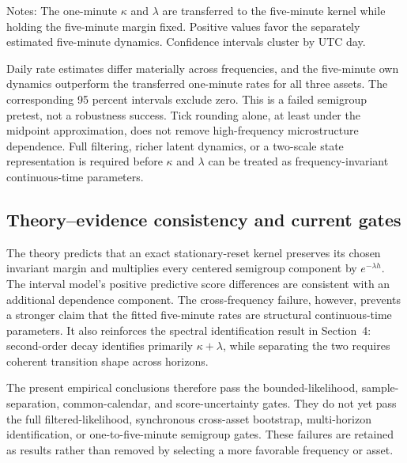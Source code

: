 \begin{table}[t]
\centering
\caption{Five-minute own fit versus transferred one-minute dynamics}
\label{tab:frequency-transfer}

\begin{minipage}{0.94\textwidth}
\footnotesize
Notes: The one-minute $\kappa$ and $\lambda$ are transferred to the five-minute
kernel while holding the five-minute margin fixed.  Positive values favor the
separately estimated five-minute dynamics.  Confidence intervals cluster by
UTC day.
\end{minipage}
\end{table}

Daily rate estimates differ materially across frequencies, and the
five-minute own dynamics outperform the transferred one-minute rates for all
three assets.  The corresponding 95 percent intervals exclude zero.  This is
a failed semigroup pretest, not a robustness success.  Tick rounding alone,
at least under the midpoint approximation, does not remove high-frequency
microstructure dependence.  Full filtering, richer latent dynamics, or a
two-scale state representation is required before $\kappa$ and $\lambda$ can
be treated as frequency-invariant continuous-time parameters.

\subsection{Theory--evidence consistency and current gates}

The theory predicts that an exact stationary-reset kernel preserves its
chosen invariant margin and multiplies every centered semigroup component by
$e^{-\lambda h}$.  The interval model's positive predictive score differences
are consistent with an additional dependence component.  The cross-frequency
failure, however, prevents a stronger claim that the fitted five-minute rates
are structural continuous-time parameters.  It also reinforces the spectral
identification result in Section~4: second-order decay identifies primarily
$\kappa+\lambda$, while separating the two requires coherent transition shape
across horizons.

The present empirical conclusions therefore pass the bounded-likelihood,
sample-separation, common-calendar, and score-uncertainty gates.  They do not
yet pass the full filtered-likelihood, synchronous cross-asset bootstrap,
multi-horizon identification, or one-to-five-minute semigroup gates.  These
failures are retained as results rather than removed by selecting a more
favorable frequency or asset.
